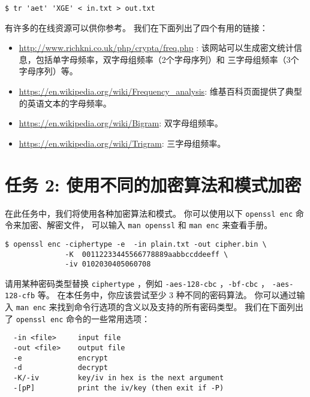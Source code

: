 \begin{lstlisting}
$ tr 'aet' 'XGE' < in.txt > out.txt
\end{lstlisting}


有许多的在线资源可以供你参考。
我们在下面列出了四个有用的链接：


\begin{itemize}
  \item \url{http://www.richkni.co.uk/php/crypta/freq.php} :
        该网站可以生成密文统计信息，包括单字母频率，双字母组频率（2个字母序列）和
        三字母组频率（3个字母序列）等。

  \item \url{https://en.wikipedia.org/wiki/Frequency_analysis}:
        维基百科页面提供了典型的英语文本的字母频率。

  \item \url{https://en.wikipedia.org/wiki/Bigram}:
        双字母组频率。

  \item \url{https://en.wikipedia.org/wiki/Trigram}:
        三字母组频率。
\end{itemize}




\section{任务 2: 使用不同的加密算法和模式加密}

在此任务中，我们将使用各种加密算法和模式。
你可以使用以下 {\tt openssl enc} 命令来加密、解密文件，
可以输入 {\tt man openssl} 和 {\tt man enc} 来查看手册。

\begin{lstlisting}
$ openssl enc -ciphertype -e  -in plain.txt -out cipher.bin \
              -K  00112233445566778889aabbccddeeff \
              -iv 0102030405060708
\end{lstlisting}

请用某种密码类型替换 {\tt ciphertype} ，例如 {\tt -aes-128-cbc} ，{\tt -bf-cbc} ，
{\tt -aes-128-cfb} 等。
在本任务中，你应该尝试至少 3 种不同的密码算法。
你可以通过输入 {\tt man enc} 来找到命令行选项的含义以及支持的所有密码类型。
我们在下面列出了 {\tt openssl enc} 命令的一些常用选项：

\begin{lstlisting}
  -in <file>     input file
  -out <file>    output file
  -e             encrypt
  -d             decrypt
  -K/-iv         key/iv in hex is the next argument
  -[pP]          print the iv/key (then exit if -P)
\end{lstlisting}




